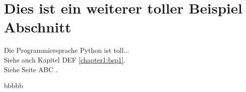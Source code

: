 \section{Dies ist ein weiterer toller Beispiel Abschnitt}



Die Programmiersprache Python ist toll... \cite{Pilgrim2009} \\

Siehe auch Kapitel DEF \ref{chapter1:bsp1}. \\

Siehe Seite ABC \pageref{chapter1:bsp1}.


bbbbb